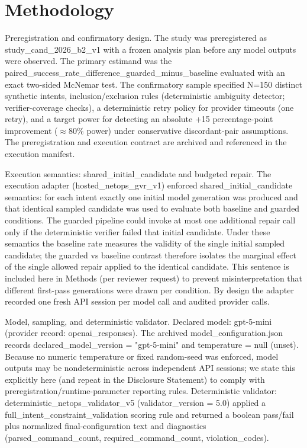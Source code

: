 \documentclass[conference]{IEEEtran}
\begin{document}
\section{Methodology}
Preregistration and confirmatory design. The study was preregistered as study\_cand\_2026\_b2\_v1 with a frozen analysis plan before any model outputs were observed. The primary estimand was the paired\_success\_rate\_difference\_guarded\_minus\_baseline evaluated with an exact two-sided McNemar test. The confirmatory sample specified N=150 distinct synthetic intents, inclusion/exclusion rules (deterministic ambiguity detector; verifier-coverage checks), a deterministic retry policy for provider timeouts (one retry), and a target power for detecting an absolute +15 percentage-point improvement (\ensuremath{\approx}80\% power) under conservative discordant-pair assumptions. The preregistration and execution contract are archived and referenced in the execution manifest.

Execution semantics: shared\_initial\_candidate and budgeted repair. The execution adapter (hosted\_netops\_gvr\_v1) enforced shared\_initial\_candidate semantics: for each intent exactly one initial model generation was produced and that identical sampled candidate was used to evaluate both baseline and guarded conditions. The guarded pipeline could invoke at most one additional repair call only if the deterministic verifier failed that initial candidate. Under these semantics the baseline rate measures the validity of the single initial sampled candidate; the guarded vs baseline contrast therefore isolates the marginal effect of the single allowed repair applied to the identical candidate. This sentence is included here in Methods (per reviewer request) to prevent misinterpretation that different first-pass generations were drawn per condition. By design the adapter recorded one fresh API session per model call and audited provider calls.

Model, sampling, and deterministic validator. Declared model: gpt-5-mini (provider record: openai\_responses). The archived model\_configuration.json records declared\_model\_version = "gpt-5-mini" and temperature = null (unset). Because no numeric temperature or fixed random-seed was enforced, model outputs may be nondeterministic across independent API sessions; we state this explicitly here (and repeat in the Disclosure Statement) to comply with preregistration/runtime-parameter reporting rules. Deterministic validator: deterministic\_netops\_validator\_v5 (validator\_version = 5.0) applied a full\_intent\_constraint\_validation scoring rule and returned a boolean pass/fail plus normalized final-configuration text and diagnostics (parsed\_command\_count, required\_command\_count, violation\_codes).
\end{document}
